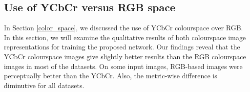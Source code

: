 \subsection{Use of YCbCr versus RGB space}
\label{ycbcr_vs_rgb}
In Section \ref{color_space}, we discussed the use of YCbCr colourspace over RGB. In this section, we will examine the qualitative results of both colourspace image representations for training the proposed network. Our findings reveal that the YCbCr colourspace images give slightly better results than the RGB colourspace images in most of the datasets. On some input images, RGB-based images were perceptually better than the YCbCr. Also, the metric-wise difference is diminutive for all datasets.

